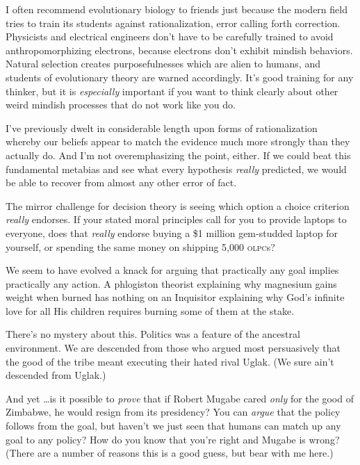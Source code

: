 {
 I often recommend evolutionary biology to friends just because the
modern field tries to train its students against rationalization, error
calling forth correction. Physicists and electrical engineers
don't have to be carefully trained to avoid
anthropomorphizing electrons, because electrons don't
exhibit mindish behaviors. Natural selection creates purposefulnesses
which are alien to humans, and students of evolutionary theory are
warned accordingly. It's good training for any thinker,
but it is \textit{especially} important if you want to think clearly
about other weird mindish processes that do not work like you do.}

\myendsectiontext


\bigskip


{
 I've previously dwelt in considerable length upon
forms of rationalization whereby our beliefs appear to match the
evidence much more strongly than they actually do. And
I'm not overemphasizing the point, either. If we could
beat this fundamental metabias and see what every hypothesis
\textit{really} predicted, we would be able to recover from almost any
other error of fact. }

{
 The mirror challenge for decision theory is seeing which option a
choice criterion \textit{really} endorses. If your stated moral
principles call for you to provide laptops to everyone, does that
\textit{really} endorse buying a \$1 million gem-studded laptop for
yourself, or spending the same money on shipping 5,000 \textsc{olpc}s?}

{
 We seem to have evolved a knack for arguing that practically any
goal implies practically any action. A phlogiston theorist explaining
why magnesium gains weight when burned has nothing on an Inquisitor
explaining why God's infinite love for all His children
requires burning some of them at the stake.}

{
 There's no mystery about this. Politics was a
feature of the ancestral environment. We are descended from those who
argued most persuasively that the good of the tribe meant executing
their hated rival Uglak. (We sure ain't descended from
Uglak.)}

{
 And yet \ldots is it possible to \textit{prove} that if Robert
Mugabe cared \textit{only} for the good of Zimbabwe, he would resign
from its presidency? You can \textit{argue} that the policy follows
from the goal, but haven't we just seen that humans can
match up any goal to any policy? How do you know that
you're right and Mugabe is wrong? (There are a number
of reasons this is a good guess, but bear with me here.)}

